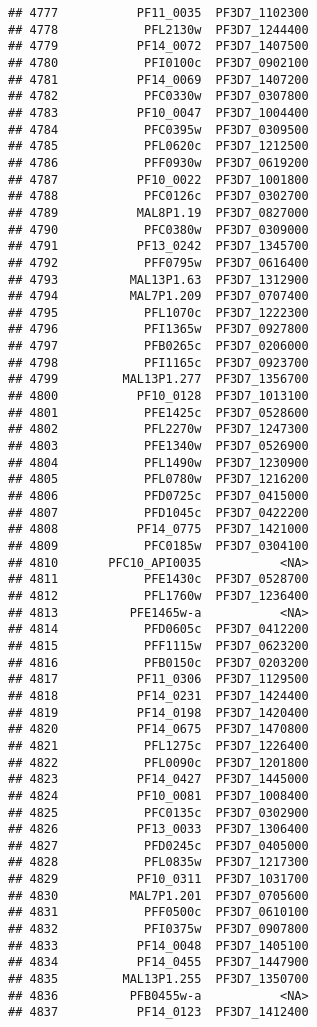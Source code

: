 \documentclass{article}\usepackage[]{graphicx}\usepackage[]{color}
\makeatletter
\newenvironment{kframe}{%
 \def\at@end@of@kframe{}%
 \ifinner\ifhmode%
  \def\at@end@of@kframe{\end{minipage}}%
  \begin{minipage}{\columnwidth}%
 \fi\fi%
 \def\FrameCommand##1{\hskip\@totalleftmargin \hskip-\fboxsep
 \colorbox{shadecolor}{##1}\hskip-\fboxsep
     \hskip-\linewidth \hskip-\@totalleftmargin \hskip\columnwidth}%
 \MakeFramed {\advance\hsize-\width
   \@totalleftmargin\z@ \linewidth\hsize
   \@setminipage}}%
 {\par\unskip\endMakeFramed%
 \at@end@of@kframe}
\newenvironment{knitrout}{}{} %
\makeatother
\begin{document}
\begin{knitrout}
\begin{kframe}
\begin{verbatim}
## 4777           PF11_0035  PF3D7_1102300
## 4778            PFL2130w  PF3D7_1244400
## 4779           PF14_0072  PF3D7_1407500
## 4780            PFI0100c  PF3D7_0902100
## 4781           PF14_0069  PF3D7_1407200
## 4782            PFC0330w  PF3D7_0307800
## 4783           PF10_0047  PF3D7_1004400
## 4784            PFC0395w  PF3D7_0309500
## 4785            PFL0620c  PF3D7_1212500
## 4786            PFF0930w  PF3D7_0619200
## 4787           PF10_0022  PF3D7_1001800
## 4788            PFC0126c  PF3D7_0302700
## 4789           MAL8P1.19  PF3D7_0827000
## 4790            PFC0380w  PF3D7_0309000
## 4791           PF13_0242  PF3D7_1345700
## 4792            PFF0795w  PF3D7_0616400
## 4793          MAL13P1.63  PF3D7_1312900
## 4794          MAL7P1.209  PF3D7_0707400
## 4795            PFL1070c  PF3D7_1222300
## 4796            PFI1365w  PF3D7_0927800
## 4797            PFB0265c  PF3D7_0206000
## 4798            PFI1165c  PF3D7_0923700
## 4799         MAL13P1.277  PF3D7_1356700
## 4800           PF10_0128  PF3D7_1013100
## 4801            PFE1425c  PF3D7_0528600
## 4802            PFL2270w  PF3D7_1247300
## 4803            PFE1340w  PF3D7_0526900
## 4804            PFL1490w  PF3D7_1230900
## 4805            PFL0780w  PF3D7_1216200
## 4806            PFD0725c  PF3D7_0415000
## 4807            PFD1045c  PF3D7_0422200
## 4808           PF14_0775  PF3D7_1421000
## 4809            PFC0185w  PF3D7_0304100
## 4810       PFC10_API0035           <NA>
## 4811            PFE1430c  PF3D7_0528700
## 4812            PFL1760w  PF3D7_1236400
## 4813          PFE1465w-a           <NA>
## 4814            PFD0605c  PF3D7_0412200
## 4815            PFF1115w  PF3D7_0623200
## 4816            PFB0150c  PF3D7_0203200
## 4817           PF11_0306  PF3D7_1129500
## 4818           PF14_0231  PF3D7_1424400
## 4819           PF14_0198  PF3D7_1420400
## 4820           PF14_0675  PF3D7_1470800
## 4821            PFL1275c  PF3D7_1226400
## 4822            PFL0090c  PF3D7_1201800
## 4823           PF14_0427  PF3D7_1445000
## 4824           PF10_0081  PF3D7_1008400
## 4825            PFC0135c  PF3D7_0302900
## 4826           PF13_0033  PF3D7_1306400
## 4827            PFD0245c  PF3D7_0405000
## 4828            PFL0835w  PF3D7_1217300
## 4829           PF10_0311  PF3D7_1031700
## 4830          MAL7P1.201  PF3D7_0705600
## 4831            PFF0500c  PF3D7_0610100
## 4832            PFI0375w  PF3D7_0907800
## 4833           PF14_0048  PF3D7_1405100
## 4834           PF14_0455  PF3D7_1447900
## 4835         MAL13P1.255  PF3D7_1350700
## 4836          PFB0455w-a           <NA>
## 4837           PF14_0123  PF3D7_1412400

\end{verbatim}
\end{kframe}
\end{knitrout}
\end{document}
